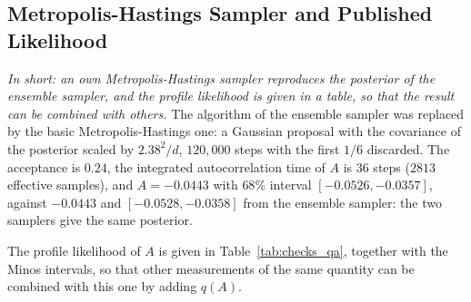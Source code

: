 \subsection{Metropolis-Hastings Sampler and Published Likelihood}
\label{sec:checks_mh}
\emph{In short: an own Metropolis-Hastings sampler reproduces the posterior of the ensemble sampler, and the profile likelihood is given in a table, so that the result can be combined with others.}
The algorithm of the ensemble sampler was replaced by the basic Metropolis-Hastings one: a Gaussian proposal with the covariance of the posterior scaled by $2.38^2/d$, $120{,}000$ steps with the first $1/6$ discarded. The acceptance is $0.24$, the integrated autocorrelation time of $A$ is $36$ steps ($2813$ effective samples), and $A=-0.0443$ with $68\%$ interval $[-0.0526,-0.0357]$, against $-0.0443$ and $[-0.0528,-0.0358]$ from the ensemble sampler: the two samplers give the same posterior.

The profile likelihood of $A$ is given in Table~\ref{tab:checks_qa}, together with the Minos intervals, so that other measurements of the same quantity can be combined with this one by adding $q(A)$.

\begin{table}[h]
\centering
{}
\caption{Profile likelihood ratio $q(A)=-2\Delta\ln L$ of the nominal fit (other parameters profiled); minimum at $-0.0441$, Minos intervals $[-0.0526,-0.0356]$ ($68\%$) and $[-0.0607,-0.0275]$ ($95\%$).}
\label{tab:checks_qa}
\end{table}

\FloatBarrier
